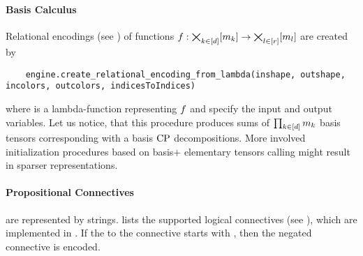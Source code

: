 \paragraph{Basis Calculus}
Relational encodings (see ) of functions $f:\bigtimes_{k\in[d]}[m_{k}] \rightarrow \bigtimes_{l\in[r]}[m_{l}]$ are created by
\begin{lstlisting}
	engine.create_relational_encoding_from_lambda(inshape, outshape, incolors, outcolors, indicesToIndices)
\end{lstlisting}
where  is a lambda-function representing $f$ and  specify the input and output variables.
Let us notice, that this procedure produces sums of $\prod_{k\in[d]}m_{k}$ basis tensors corresponding with a basis $\mathrm{CP}$ decompositions.
More involved initialization procedures based on basis+ elementary tensors calling  might result in sparser representations.

\paragraph{Propositional Connectives} are represented by strings.
 lists the supported logical connectives (see ), which are implemented in .
If the  to the connective starts with , then the negated connective is encoded.

